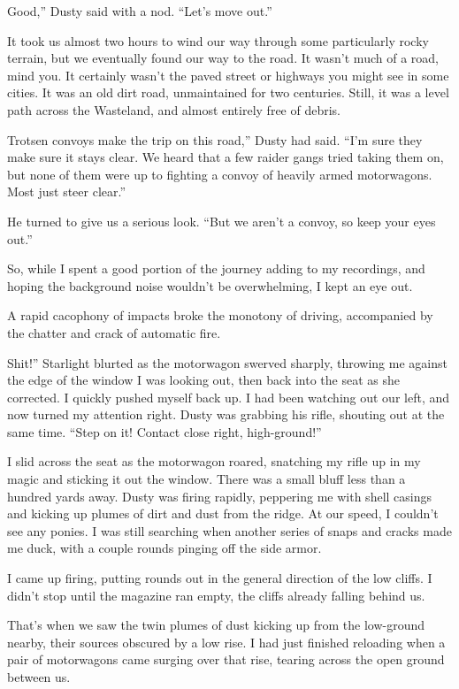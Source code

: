 \leavevmode{}Good,” Dusty said with a nod. “Let’s move out.”

{\br}%
It took us almost two hours to wind our way through some particularly rocky terrain, but we eventually found our way to the road. It wasn’t much of a road, mind you. It certainly wasn’t the paved street or highways you might see in some cities. It was an old dirt road, unmaintained for two centuries. Still, it was a level path across the Wasteland, and almost entirely free of debris.

\leavevmode{}Trotsen convoys make the trip on this road,” Dusty had said. “I’m sure they make sure it stays clear. We heard that a few raider gangs tried taking them on, but none of them were up to fighting a convoy of heavily armed motorwagons. Most just steer clear.”

He turned to give us a serious look. “But we aren’t a convoy, so keep your eyes out.”

So, while I spent a good portion of the journey adding to my recordings, and hoping the background noise wouldn’t be overwhelming, I kept an eye out.

{\br}%
A rapid cacophony of impacts broke the monotony of driving, accompanied by the chatter and crack of automatic fire.

\leavevmode{}Shit!” Starlight blurted as the motorwagon swerved sharply, throwing me against the edge of the window I was looking out, then back into the seat as she corrected. I quickly pushed myself back up. I had been watching out our left, and now turned my attention right. Dusty was grabbing his rifle, shouting out at the same time. “Step on it! Contact close right, high-ground!”

I slid across the seat as the motorwagon roared, snatching my rifle up in my magic and sticking it out the window. There was a small bluff less than a hundred yards away. Dusty was firing rapidly, peppering me with shell casings and kicking up plumes of dirt and dust from the ridge. At our speed, I couldn’t see any ponies. I was still searching when another series of snaps and cracks made me duck, with a couple rounds pinging off the side armor.

I came up firing, putting rounds out in the general direction of the low cliffs. I didn’t stop until the magazine ran empty, the cliffs already falling behind us.

That’s when we saw the twin plumes of dust kicking up from the low-ground nearby, their sources obscured by a low rise. I had just finished reloading when a pair of motorwagons came surging over that rise, tearing across the open ground between us.

